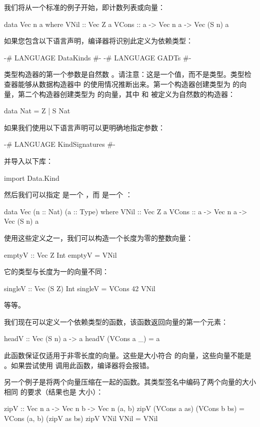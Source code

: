 \documentclass[DaoFP]{subfiles}
\begin{document}
 我们将从一个标准的例子开始，即计数列表或向量：
 \begin{haskell}
  data Vec n a where
  VNil  :: Vec Z a
  VCons :: a -> Vec n a -> Vec (S n) a
 \end{haskell}
 如果您包含以下语言声明，编译器将识别此定义为依赖类型：
 \begin{haskell}
 {-# LANGUAGE DataKinds #-}
 {-# LANGUAGE GADTs #-}
 \end{haskell}
 类型构造器的第一个参数是自然数 。请注意：这是一个值，而不是类型。类型检查器能够从数据构造器中  的使用情况推断出来。第一个构造器创建类型为  的向量，第二个构造器创建类型为  的向量，其中  和  被定义为自然数的构造器：
 \begin{haskell}
  data Nat = Z | S Nat
 \end{haskell}

 如果我们使用以下语言声明可以更明确地指定参数：
 \begin{haskell}
 {-# LANGUAGE KindSignatures #-}
 \end{haskell}
 并导入以下库：
 \begin{haskell}
  import Data.Kind
 \end{haskell}
 然后我们可以指定  是一个 ，而  是一个 ：
 \begin{haskell}
  data Vec (n :: Nat) (a :: Type) where
  VNil  :: Vec Z a
  VCons :: a -> Vec n a -> Vec (S n) a
 \end{haskell}

 使用这些定义之一，我们可以构造一个长度为零的整数向量：
 \begin{haskell}
  emptyV :: Vec Z Int
  emptyV = VNil
 \end{haskell}
 它的类型与长度为一的向量不同：
 \begin{haskell}
  singleV :: Vec (S Z) Int
  singleV = VCons 42 VNil
 \end{haskell}
 等等。

 我们现在可以定义一个依赖类型的函数，该函数返回向量的第一个元素：
 \begin{haskell}
  headV :: Vec (S n) a -> a
  headV (VCons a _) = a
 \end{haskell}
 此函数保证仅适用于非零长度的向量。这些是大小符合  的向量，这些向量不能是 。如果尝试使用  调用此函数，编译器将会报错。

 另一个例子是将两个向量压缩在一起的函数。其类型签名中编码了两个向量的大小相同  的要求（结果也是  大小）：
 \begin{haskell}
  zipV :: Vec n a -> Vec n b -> Vec n (a, b)
  zipV (VCons a as) (VCons b bs) = VCons (a, b) (zipV as bs)
  zipV VNil VNil = VNil
 \end{haskell}
\end{document}
